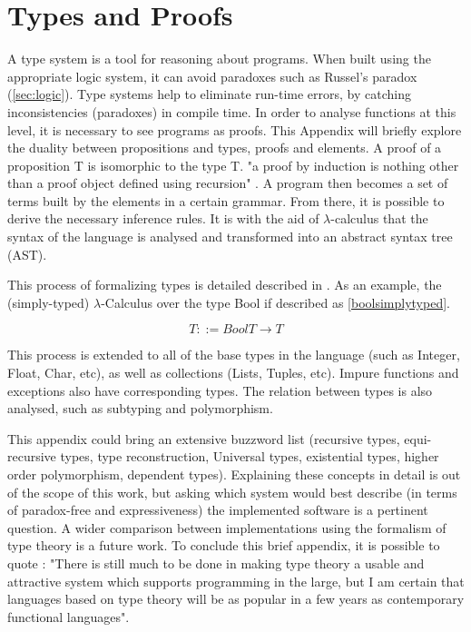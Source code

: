 \chapter{Types and Proofs}
\label{sec:proofs}

A type system is a tool for reasoning about programs. When built using the appropriate logic system, it can avoid paradoxes such as Russel's paradox (\ref{sec:logic}). Type systems help to eliminate run-time errors, by catching inconsistencies (paradoxes) in compile time. In order to analyse functions at this level, it is necessary to see programs as proofs. This Appendix will briefly explore the duality between propositions and types, proofs and elements. A proof of a proposition T is isomorphic to the type T. "a proof by induction is nothing other than a proof object defined using recursion" \cite{thompson1991type}. A program then becomes a set of terms built by the elements in a certain grammar. From there, it is possible to derive the necessary inference rules. It is with the aid of $\lambda$-calculus that the syntax of the language is analysed and transformed into an abstract syntax tree (AST).

This process of formalizing types is detailed described in \cite{pierce2002types}. As an example, the (simply-typed) $\lambda$-Calculus over the type Bool if described as \ref{boolsimplytyped}.

\begin{subequations}\label{boolsimplytyped}
\begin{equation}
    T ::= 
\end{equation}
\begin{equation}
    Bool
\end{equation}
\begin{equation}
    T \rightarrow T
\end{equation}
\end{subequations}

This process is extended to all of the base types in the language (such as Integer, Float, Char, etc), as well as collections (Lists, Tuples, etc). Impure functions and exceptions also have corresponding types. The relation between types is also analysed, such as subtyping and polymorphism.

This appendix could bring an extensive buzzword list (recursive types, equi-recursive types, type reconstruction, Universal types, existential types, higher order polymorphism, dependent types). Explaining these concepts in detail is out of the scope of this work, but asking which system would best describe (in terms of paradox-free and expressiveness) the implemented software is a pertinent question. A wider comparison between implementations using the formalism of type theory is a future work. To conclude this brief appendix, it is possible to quote \cite{thompson1991type}: "There is still much to be done in making type theory a usable and attractive system which supports programming in the large, but I am certain that languages based on type theory will be as popular in a few years as contemporary functional languages".




